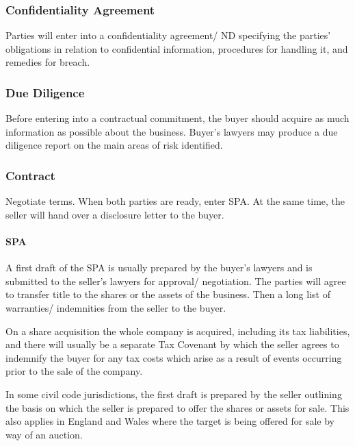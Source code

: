 \documentclass[
]{article}
\begin{document}
\hypertarget{confidentiality-agreement}{%
\subsubsection{Confidentiality
Agreement}\label{confidentiality-agreement}}

Parties will enter into a confidentiality agreement/ ND specifying the
parties' obligations in relation to confidential information, procedures
for handling it, and remedies for breach.

\hypertarget{due-diligence}{%
\subsubsection{Due Diligence}\label{due-diligence}}

Before entering into a contractual commitment, the buyer should acquire
as much information as possible about the business. Buyer's lawyers may
produce a due diligence report on the main areas of risk identified.

\hypertarget{contract}{%
\subsubsection{Contract}\label{contract}}

Negotiate terms. When both parties are ready, enter SPA. At the same
time, the seller will hand over a disclosure letter to the buyer.

\hypertarget{spa}{%
\paragraph{SPA}\label{spa}}

A first draft of the SPA is usually prepared by the buyer's lawyers and
is submitted to the seller's lawyers for approval/ negotiation. The
parties will agree to transfer title to the shares or the assets of the
business. Then a long list of warranties/ indemnities from the seller to
the buyer.

On a share acquisition the whole company is acquired, including its tax
liabilities, and there will usually be a separate Tax Covenant by which
the seller agrees to indemnify the buyer for any tax costs which arise
as a result of events occurring prior to the sale of the company.

In some civil code jurisdictions, the first draft is prepared by the
seller outlining the basis on which the seller is prepared to offer the
shares or assets for sale. This also applies in England and Wales where
the target is being offered for sale by way of an auction.
\end{document}
